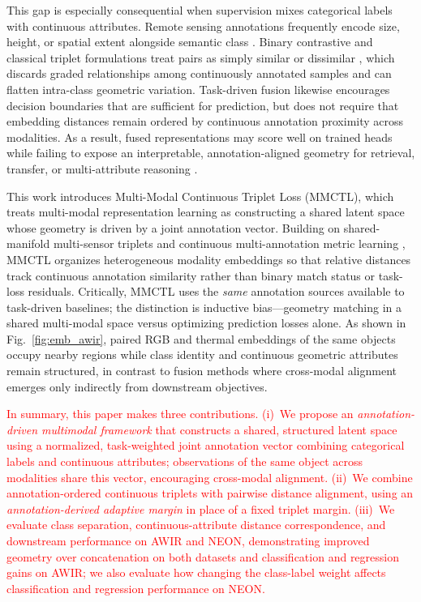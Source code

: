\documentclass[10pt,twocolumn,letterpaper]{article}
\newcommand{\new}[1]{\textcolor{red}{#1}}
\begin{document}
This gap is especially consequential when supervision mixes categorical labels with continuous attributes. Remote sensing annotations frequently encode size, height, or spatial extent alongside semantic class \cite{sun2023single}. Binary contrastive and classical triplet formulations treat pairs as simply similar or dissimilar \cite{khosla2020supervised}, which discards graded relationships among continuously annotated samples and can flatten intra-class geometric variation. Task-driven fusion likewise encourages decision boundaries that are sufficient for prediction, but does not require that embedding distances remain ordered by continuous annotation proximity across modalities. As a result, fused representations may score well on trained heads while failing to expose an interpretable, annotation-aligned geometry for retrieval, transfer, or multi-attribute reasoning \cite{saidi2024deep}.

This work introduces Multi-Modal Continuous Triplet Loss (MMCTL), which treats multi-modal representation learning as constructing a shared latent space whose geometry is driven by a joint annotation vector. Building on shared-manifold multi-sensor triplets \cite{dutt2022shared} and continuous multi-annotation metric learning \cite{zhou2025multi,kim2019deep}, MMCTL organizes heterogeneous modality embeddings so that relative distances track continuous annotation similarity rather than binary match status or task-loss residuals. Critically, MMCTL uses the \emph{same} annotation sources available to task-driven baselines; the distinction is inductive bias---geometry matching in a shared multi-modal space versus optimizing prediction losses alone. As shown in Fig.~\ref{fig:emb_awir}, paired RGB and thermal embeddings of the same objects occupy nearby regions while class identity and continuous geometric attributes remain structured, in contrast to fusion methods where cross-modal alignment emerges only indirectly from downstream objectives.

\new{In summary, this paper makes three contributions. (i)~We propose an \emph{annotation-driven multimodal framework} that constructs a shared, structured latent space using a normalized, task-weighted joint annotation vector combining categorical labels and continuous attributes; observations of the same object across modalities share this vector, encouraging cross-modal alignment. (ii)~We combine annotation-ordered continuous triplets with pairwise distance alignment, using an \emph{annotation-derived adaptive margin} in place of a fixed triplet margin. (iii)~We evaluate class separation, continuous-attribute distance correspondence, and downstream performance on AWIR and NEON, demonstrating improved geometry over concatenation on both datasets and classification and regression gains on AWIR; we also evaluate how changing the class-label weight affects classification and regression performance on NEON.}
\end{document}
